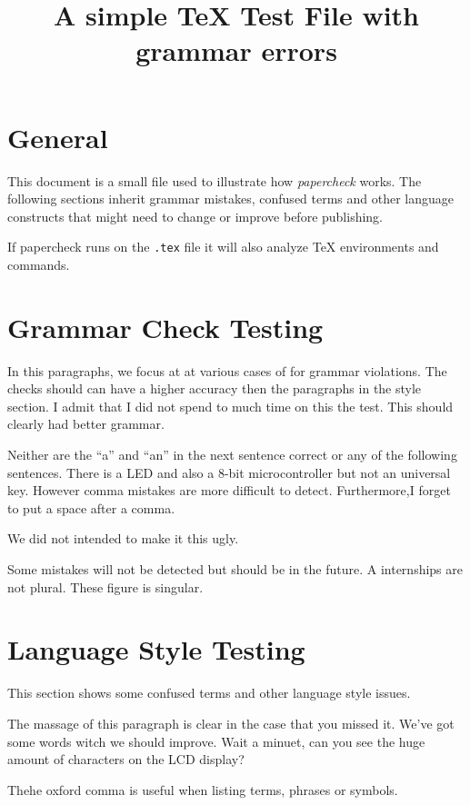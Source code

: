 \documentclass{scrartcl}
\title{A simple TeX Test File with grammar errors}
\begin{document}
\maketitle


\section{General}
This document is a small file used to illustrate how \emph{papercheck} works.
The following sections inherit grammar mistakes, confused terms and other language constructs that might need to change or improve before publishing.


If papercheck runs on the \verb!.tex! file it will also analyze TeX environments and commands.




\section{Grammar Check Testing}
In this paragraphs, we focus at at various cases of for grammar violations.
The checks should can have a higher accuracy then the paragraphs in the style section.
I admit that I did not spend to much time on this the test.
This should clearly had better grammar.

Neither are the “a” and “an” in the next sentence correct or any of the following sentences.
There is a LED and also a 8-bit microcontroller but not an universal key.
However comma mistakes are more difficult to detect.
Furthermore,I forget to put a space after a comma.

We did not intended to make it this ugly.

Some mistakes will not be detected but should be in the future.
A internships are not plural. These figure is singular.






\section{Language Style Testing}
This section shows some confused terms and other language style issues.

The massage of this paragraph is clear in the case that you missed it. We've got some words witch we should improve.
Wait a minuet, can you see the huge amount of characters on the LCD display? 

Thehe oxford comma is useful when listing terms, phrases or symbols.
\end{document}
